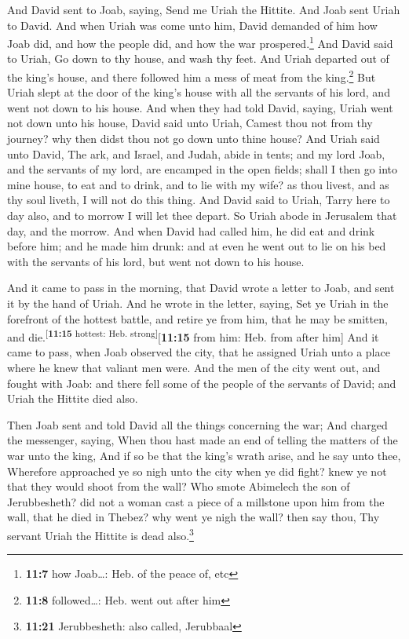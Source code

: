  And David sent to Joab, saying, Send me Uriah the
Hittite. And Joab sent Uriah to David.  And when Uriah was
come unto him, David demanded of him how Joab did, and how the people
did, and how the war prospered.\footnote{\textbf{11:7} how Joab\ldots:
  Heb. of the peace of, etc}  And David said to Uriah, Go
down to thy house, and wash thy feet. And Uriah departed out of the
king's house, and there followed him a mess of meat from the
king.\footnote{\textbf{11:8} followed\ldots: Heb. went out after him}
 But Uriah slept at the door of the king's house with all
the servants of his lord, and went not down to his house.
 And when they had told David, saying, Uriah went not
down unto his house, David said unto Uriah, Camest thou not from thy
journey? why then didst thou not go down unto thine house?
 And Uriah said unto David, The ark, and Israel, and
Judah, abide in tents; and my lord Joab, and the servants of my lord,
are encamped in the open fields; shall I then go into mine house, to eat
and to drink, and to lie with my wife? as thou livest, and as thy soul
liveth, I will not do this thing.  And David said to
Uriah, Tarry here to day also, and to morrow I will let thee depart. So
Uriah abode in Jerusalem that day, and the morrow.  And
when David had called him, he did eat and drink before him; and he made
him drunk: and at even he went out to lie on his bed with the servants
of his lord, but went not down to his house.

 And it came to pass in the morning, that David wrote a
letter to Joab, and sent it by the hand of Uriah.  And he
wrote in the letter, saying, Set ye Uriah in the forefront of the
hottest battle, and retire ye from him, that he may be smitten, and
die.\textsuperscript{{[}\textbf{11:15} hottest: Heb.
strong{]}}{[}\textbf{11:15} from him: Heb. from after him{]}
 And it came to pass, when Joab observed the city, that
he assigned Uriah unto a place where he knew that valiant men were.
 And the men of the city went out, and fought with Joab:
and there fell some of the people of the servants of David; and Uriah
the Hittite died also.

 Then Joab sent and told David all the things concerning
the war;  And charged the messenger, saying, When thou
hast made an end of telling the matters of the war unto the king,
 And if so be that the king's wrath arise, and he say
unto thee, Wherefore approached ye so nigh unto the city when ye did
fight? knew ye not that they would shoot from the wall? 
Who smote Abimelech the son of Jerubbesheth? did not a woman cast a
piece of a millstone upon him from the wall, that he died in Thebez? why
went ye nigh the wall? then say thou, Thy servant Uriah the Hittite is
dead also.\footnote{\textbf{11:21} Jerubbesheth: also called, Jerubbaal}

